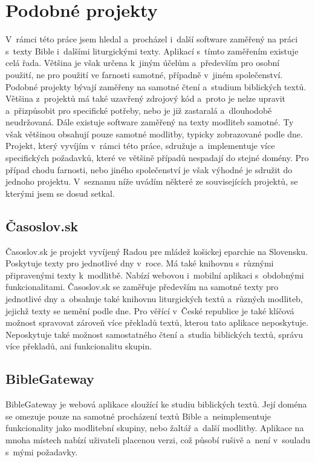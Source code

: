 \documentclass[
  tables=false,
  glossaries,
  index
]{kidiplom}
\begin{document}
\section{Podobné projekty}
V~rámci této práce jsem hledal a~procházel i~další software zaměřený na práci s~texty Bible i~dalšími liturgickými texty. Aplikací s~tímto zaměřením existuje celá řada. Většina je však určena k~jiným účelům a~především pro osobní použití, ne pro použití ve farnosti samotné, případně v~jiném společenství. Podobné projekty bývají zaměřeny na samotné čtení a~studium biblických textů. Většina z~projektů má také uzavřený zdrojový kód a~proto je nelze upravit a~přizpůsobit pro specifické potřeby, nebo je již zastaralá a~dlouhodobě neudržovaná. Dále existuje software zaměřený na texty modliteb samotné. Ty však většinou obsahují pouze samotné modlitby, typicky zobrazované podle dne. Projekt, který vyvíjím v~rámci této práce, sdružuje a~implementuje více specifických požadavků, které ve většině případů nespadají do stejné domény. Pro případ chodu farnosti, nebo jiného společenství je však výhodné je sdružit do jednoho projektu. V~seznamu níže uvádím některé ze souvisejících projektů, se kterými jsem se dosud setkal.

\subsection{Časoslov.sk}
Časoslov.sk\cite{casoslov.sk} je projekt vyvíjený Radou pre mládež košickej eparchie na Slovensku. Poskytuje texty pro jednotlivé dny v~roce. Má také knihovnu s~různými připravenými texty k~modlitbě. Nabízí webovou i~mobilní aplikaci s~obdobnými funkcionalitami. Časoslov.sk se zaměřuje především na samotné texty pro jednotlivé dny a~obsahuje také knihovnu liturgických textů a~různých modliteb, jejichž texty se nemění podle dne. Pro věřící v~České republice je také klíčová možnost spravovat zároveň více překladů textů, kterou tato aplikace neposkytuje. Neposkytuje také možnost samostatného čtení a~studia biblických textů, správu více překladů, ani funkcionalitu skupin.

\subsection{BibleGateway}
BibleGateway\cite{biblegateway} je webová aplikace sloužící ke studiu biblických textů. Její doména se omezuje pouze na samotné procházení textů Bible a~neimplementuje funkcionality jako modlitební skupiny, nebo žaltář a~další modlitby. Aplikace na mnoha místech nabízí uživateli placenou verzi, což působí rušivě a~není v~souladu s~mými požadavky.
\end{document}
